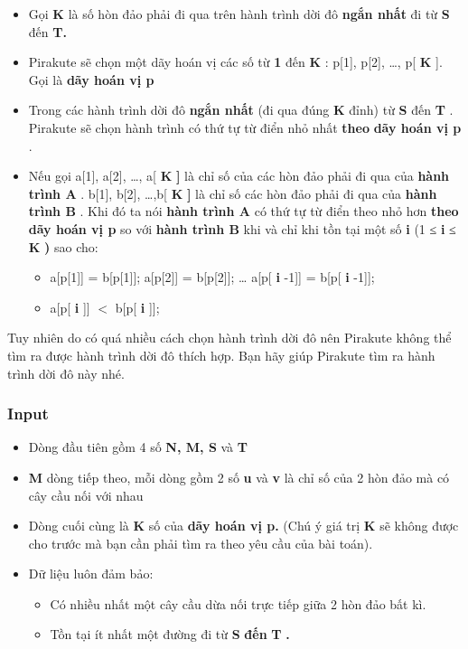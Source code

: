 \begin{itemize}
	\item Gọi \textbf{ K } là số hòn đảo phải đi qua trên hành trình dời đô \textbf{ ngắn nhất } đi từ \textbf{ S } đến \textbf{ T. }
	\item Pirakute sẽ chọn một dãy hoán vị các số từ \textbf{ 1 } đến \textbf{ K } : p[1], p[2], …, p[ \textbf{ K } ]. Gọi là \textbf{ dãy hoán vị p }
	\item Trong các hành trình dời đô \textbf{ ngắn nhất } (đi qua đúng \textbf{ K } đỉnh) từ \textbf{ S } đến \textbf{ T } . Pirakute sẽ chọn hành trình có thứ tự từ điển nhỏ nhất \textbf{ theo }\textbf{ dãy hoán vị p } .
	\item Nếu gọi a[1], a[2], …, a[ \textbf{ K }\textbf{ ] } là chỉ số của các hòn đảo phải đi qua của \textbf{ hành trình A } . b[1], b[2], …,b[ \textbf{ K }\textbf{ ] }\textbf{} là chỉ số các hòn đảo phải đi qua của \textbf{ hành trình B } . Khi đó ta nói \textbf{ hành trình A } có thứ tự từ điển theo nhỏ hơn \textbf{}\textbf{ theo }\textbf{ dãy hoán vị p } so với \textbf{ hành trình B } khi và chỉ khi tồn tại một số \textbf{ i } (1 ≤ \textbf{ i } ≤ \textbf{ K }\textbf{ ) }\textbf{} sao cho:
\begin{itemize}
	\item a[p[1]] = b[p[1]]; a[p[2]] = b[p[2]]; … a[p[ \textbf{ i } -1]] = b[p[ \textbf{ i } -1]];
\end{itemize}
\begin{itemize}
	\item a[p[ \textbf{ i } ]] $<$ b[p[ \textbf{ i } ]];
\end{itemize}
\end{itemize}
\begin{itemize}
\end{itemize}

Tuy nhiên do có quá nhiều cách chọn hành trình dời đô nên Pirakute không thể tìm ra được hành trình dời đô thích hợp. Bạn hãy giúp Pirakute tìm ra hành trình dời đô này nhé.

\subsubsection{Input}
\begin{itemize}
	\item Dòng đầu tiên gồm 4 số \textbf{ N, M, S } và \textbf{ T }
	\item \textbf{M } dòng tiếp theo, mỗi dòng gồm 2 số \textbf{ u } và \textbf{ v } là chỉ số của 2 hòn đảo mà có cây cầu nối với nhau
	\item Dòng cuối cùng là \textbf{ K } số của \textbf{ dãy hoán vị p. } (Chú ý giá trị \textbf{ K } sẽ không được cho trước mà bạn cần phải tìm ra theo yêu cầu của bài toán).
	\item Dữ liệu luôn đảm bảo:
\begin{itemize}
	\item Có nhiều nhất một cây cầu dừa nối trực tiếp giữa 2 hòn đảo bất kì.
	\item Tồn tại ít nhất một đường đi từ \textbf{ S }\textbf{ đến }\textbf{ T }\textbf{ . }
\end{itemize}
\end{itemize}

